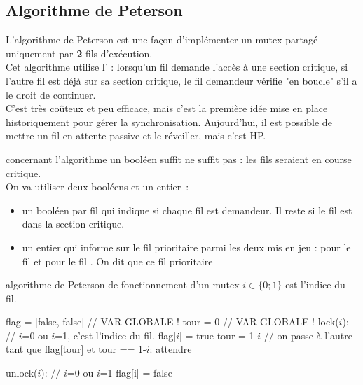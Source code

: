 \begin{adjustwidth}{-3cm}{-3cm}
\subsection{Algorithme de Peterson}

L'algorithme de Peterson est une façon d'implémenter un mutex partagé uniquement par \textbf{2} fils d'exécution.\\
Cet algorithme utilise l' : lorsqu'un fil  demande l'accès à une section critique, si l'autre fil  est déjà sur sa section critique, le fil demandeur  vérifie "en boucle" s'il a le droit de continuer.\\
C'est très coûteux et peu efficace, mais c'est la première idée mise en place historiquement pour gérer la synchronisation. Aujourd'hui, il est possible de mettre un fil en attente passive et le réveiller, mais c'est HP.

\begin{remarque}{}{concernant l'algorithme}
    un booléen suffit ne suffit pas : les fils seraient en course critique.\\
    On va utiliser deux booléens et un entier~:
    \begin{itemize}
        \item un booléen par fil qui indique si chaque fil est demandeur. Il reste  si le fil est dans la section critique.
        \item un entier qui informe sur le fil prioritaire parmi les deux mis en jeu :  pour le fil  et  pour le fil . On dit que ce fil prioritaire 
    \end{itemize}
\end{remarque}

\begin{implementation}{algorithme de Peterson de fonctionnement d'un mutex}
    $i \in \{0;1\}$ est l'indice du fil.
    \begin{lstLNat}
    flag = [false, false] // VAR GLOBALE !
    tour = 0 // VAR GLOBALE !
    lock($i$): // $i$=0 ou $i$=1, c'est l'indice du fil.
        flag[$i$] = true
        tour = 1-$i$ // on passe à l'autre
        tant que flag[tour] et tour == 1-$i$:
            attendre
    
    unlock($i$): // $i$=0 ou $i$=1
        flag[i] = false
    \end{lstLNat}
\end{implementation}


\end{adjustwidth}
